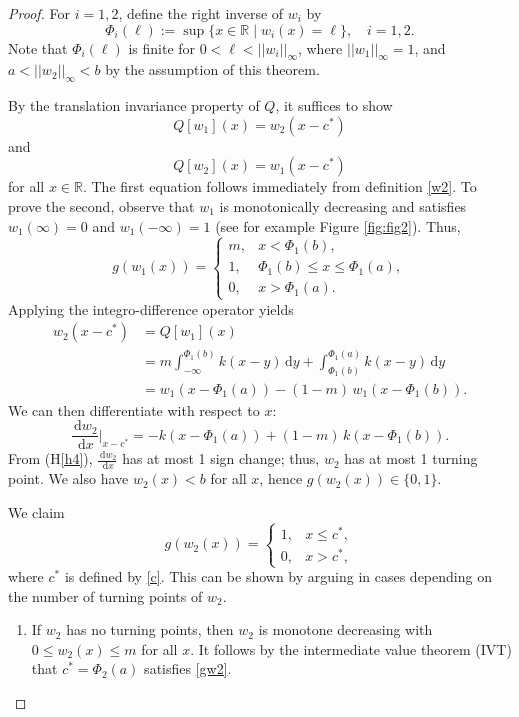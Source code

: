 \documentclass[11pt]{article}
\theoremstyle{definition}
\numberwithin{equation}{section}
\numberwithin{thm}{section}
\renewcommand{\a}{a}
\renewcommand{\b}{b}
\newcommand{\m}{m}
\newcommand{\mtwo}{1}
\renewcommand{\d}{\,\mathrm{d}}
\newcommand{\D}[1]{\frac{\d #1}{\d x}}
\newcommand{\hypref}[1]{{(H{\ref{#1}})}}
\begin{document}
\begin{proof}
For $i = 1,2$, define the right inverse of $w_i$ by
\begin{equation}
\Phi_i(\ell) := \sup \{ x \in \mathbb R \mid w_i(x) = \ell \}, \quad i=1,2.
\end{equation}
Note that $\Phi_i(\ell)$ is finite for $0<\ell<||w_i||_\infty$, where $||w_1||_\infty=1$, and $\a<||w_2||_\infty<\b$ by the assumption of this theorem.

By the translation invariance property of $Q$, it suffices to show
\begin{equation} \label{qw1}
Q[w_1](x) = w_2(x-c^*)
\end{equation}
and
\begin{equation} \label{qw2}
Q[w_2](x) = w_1(x-c^*)
\end{equation}
for all $x \in \mathbb R$.
The first equation follows immediately from definition \eqref{w2}.
To prove the second, observe that $w_1$ is monotonically decreasing and satisfies $w_1(\infty)=0$ and $w_1(-\infty)=1$ (see for example Figure \ref{fig:fig2}).
Thus,
$$
g(w_1(x)) = \begin{cases}
\m, & x < \Phi_1(\b), \\
1, & \Phi_1(\b) \leq x \leq \Phi_1(\a), \\
0, & x > \Phi_1(\a).
\end{cases}
$$
Applying the integro-difference operator yields
$$ \begin{aligned}
w_2(x-c^*) &= Q[w_1](x) \\
&= \m \int_{-\infty}^{\Phi_1(\b)} k(x-y) \d y + \int_{\Phi_1(\b)}^{\Phi_1(\a)} k(x-y) \d y \\
&= w_1(x-\Phi_1(\a)) - (1-\m)\, w_1(x-\Phi_1(\b)).
\end{aligned}$$
We can then differentiate with respect to $x$:
$$
\D{w_2} \Big| _{x-c^*}= - k(x-\Phi_1(\a)) + (\mtwo-\m) \, k(x-\Phi_1(\b)).
$$
From \hypref{h4}, $\D{w_2}$ has at most 1 sign change; thus, $w_2$ has at most 1 turning point.
We also have $w_2(x)<b$ for all $x$, hence $g(w_2(x)) \in \{0, 1 \}$.

We claim
\begin{equation} \label{gw2}
g(w_2(x)) = \begin{cases}
1, & x \leq c^*, \\
0, & x > c^*,
\end{cases}
\end{equation}
where $c^*$ is defined by \eqref{c}.
This can be shown by arguing in cases depending on the number of turning points of $w_2$.
\begin{enumerate}[{Case} 1.]
\item If $w_2$ has no turning points, then $w_2$ is monotone decreasing with $0 \leq w_2(x) \leq \m$ for all $x$.
It follows by the intermediate value theorem (IVT) that $c^* = \Phi_2(\a)$ satisfies \eqref{gw2}.


\end{enumerate}
\end{proof}
\end{document}
